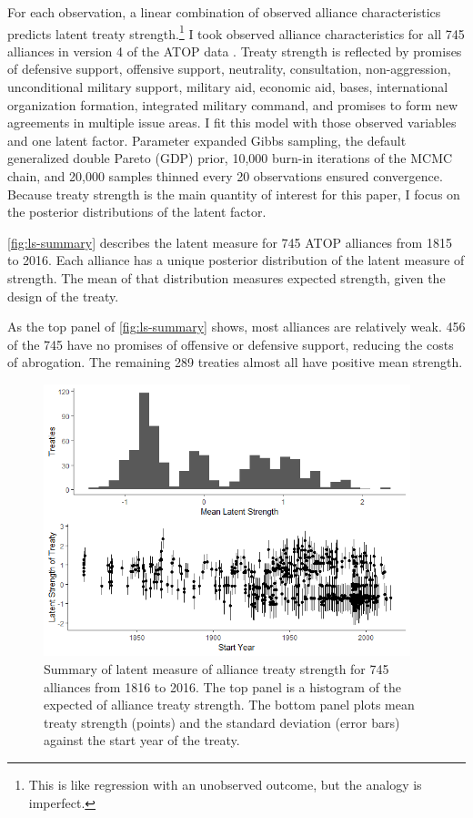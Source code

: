\documentclass[12pt]{article}
\begin{document}
For each observation, a linear combination of observed alliance characteristics predicts latent treaty strength.\footnote{This is like regression with an unobserved outcome, but the analogy is imperfect.} 
I took observed alliance characteristics for all 745 alliances in version 4 of the ATOP data \citep{Leedsetal2002}. 
Treaty strength is reflected by promises of defensive support, offensive support, neutrality, consultation, non-aggression, unconditional military support, military aid, economic aid, bases, international organization formation, integrated military command, and promises to form new agreements in multiple issue areas. 
I fit this model with those observed variables and one latent factor.
Parameter expanded Gibbs sampling, the default generalized double Pareto (GDP) prior, 10,000 burn-in iterations of the MCMC chain, and 20,000 samples thinned every 20 observations ensured convergence. 
Because treaty strength is the main quantity of interest for this paper, I focus on the posterior distributions of the latent factor. 


\autoref{fig:ls-summary} describes the latent measure for 745 ATOP alliances from 1815 to 2016. 
Each alliance has a unique posterior distribution of the latent measure of strength. 
The mean of that distribution measures expected strength, given the design of the treaty.


As the top panel of \autoref{fig:ls-summary} shows, most alliances are relatively weak.
456 of the 745 have no promises of offensive or defensive support, reducing the costs of abrogation. 
The remaining 289 treaties almost all have positive mean strength. 


\begin{figure}
	\centering
		\includegraphics[width=0.95\textwidth]{../figures/ls-summary.png}
	\caption{Summary of latent measure of alliance treaty strength for 745 alliances from 1816 to 2016. The top panel is a histogram of the expected of alliance treaty strength. The bottom panel plots mean treaty strength (points) and the standard deviation (error bars) against the start year of the treaty.}
	\label{fig:ls-summary}
\end{figure}
	
\end{document}
